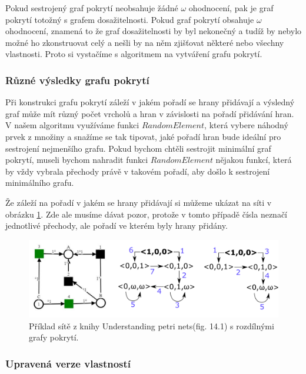 \documentclass[
  biblatex,
  glossaries,
]{kidiplom}
\begin{document}
Pokud sestrojený graf pokrytí neobsahuje žádné $\omega$ ohodnocení,
pak je graf pokrytí totožný s grafem dosažitelnosti. 
Pokud graf pokrytí obsahuje $\omega$ ohodnocení, znamená to že 
graf dosažitelnosti by byl nekonečný a tudíž by nebylo možné 
ho zkonstruovat celý a nešli by na něm zjišťovat některé nebo všechny vlastnosti.
Proto si vystačíme s algoritmem na vytváření grafu pokrytí.

\subsubsection{Různé výsledky grafu pokrytí}

Při konstrukci grafu pokrytí záleží v jakém pořadí se hrany přidávají
a výsledný graf může mít různý počet vrcholů a hran 
v závislosti na pořadí přidávání hran.
V našem algoritmu využíváme funkci $RandomElement$, která vybere 
náhodný prvek z množiny a snažíme se tak tipovat, jaké pořadí hran bude
ideální pro sestrojení nejmenšího grafu. 
Pokud bychom chtěli sestrojit minimální 
graf pokrytí, museli bychom nahradit funkci $RandomElement$ nějakou
funkcí, která by vždy vybrala přechody právě 
v takovém pořadí, aby došlo k sestrojení minimálního grafu.

Že záleží na pořadí v jakém se hrany přidávají si můžeme ukázat na 
síti v obrázku \ref{fig:síť různé coverability}. Zde ale musíme 
dávat pozor, protože v tomto případě čísla neznačí jednotlivé přechody,
ale pořadí ve kterém byly hrany přidány.

\begin{figure}[h]
  \centering
  \includegraphics[width=\linewidth]{net_coverability_difference}
  \caption[Příklad sítě s rozdílnými grafy pokrytí. (fig.  14.1)]{Příklad sítě z knihy Understanding petri nets\cite{reisig2013understanding}(fig.  14.1) s rozdílnými grafy pokrytí. }\label{fig:síť různé coverability}
\end{figure}


\subsubsection{Upravená verze vlastností}\label{Upravená verze vlastností}
\end{document}

